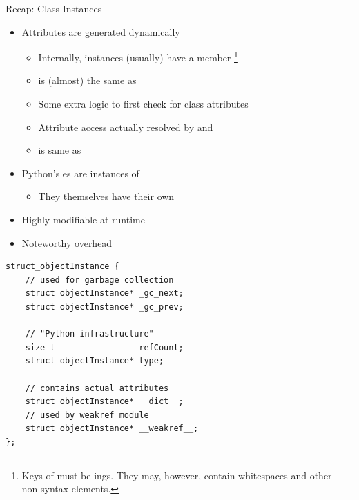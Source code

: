 
\begin{frame}{Recap: Class Instances}
%
\begin{itemize}
\item Attributes are generated dynamically
	\begin{itemize}
	\item Internally,  instances (usually) have a member \footnote{%
		Keys of  must be ings. They may, however, contain whitespaces and other non-syntax elements.}
	\item {} is (almost) the same as 
	\item Some extra logic to first check for class attributes
	\item Attribute access actually resolved by  and 
	\item {} is same as  
	\end{itemize}
\item Python's es are instances of 
	\begin{itemize}
	\item They themselves have their own 
	\end{itemize}
\item[\Thus] Highly modifiable at runtime
\item[\Thus] Noteworthy overhead
\end{itemize}
%
%
\end{frame}


\begin{frame}[fragile]
%
\begin{codebox}
\begin{verbatim}
struct_objectInstance {
    // used for garbage collection
    struct objectInstance* _gc_next;    
    struct objectInstance* _gc_prev;
    
    // "Python infrastructure"
    size_t                 refCount;
    struct objectInstance* type;
    
    // contains actual attributes
    struct objectInstance* __dict__;
    // used by weakref module
    struct objectInstance* __weakref__;
};
\end{verbatim}
\end{codebox}
%
\end{frame}

